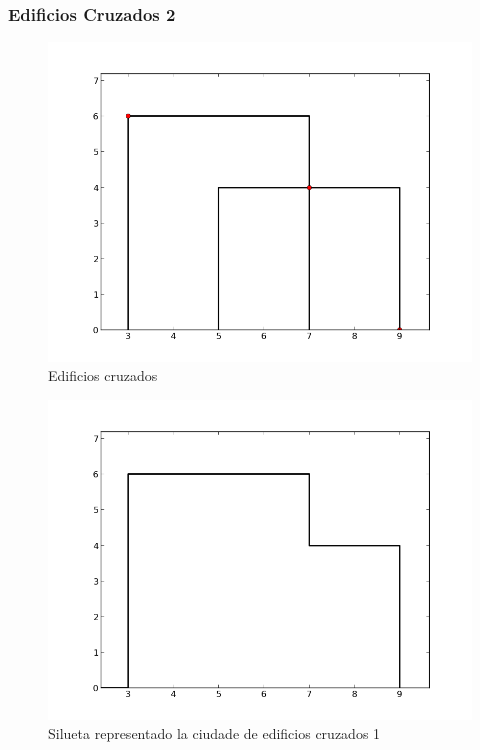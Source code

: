\subsubsection*{Edificios Cruzados 2}
\begin{figure}[H]
\begin{center}
\includegraphics[scale=0.5]{./imagenes/ej2_edificio3.png}
\caption{Edificios cruzados}
\end{center}
\end{figure}
\begin{figure}[H]
\begin{center}
\includegraphics[scale=0.5]{./imagenes/ej2_edificio3solucion.png}
\caption{Silueta representado la ciudade de edificios cruzados 1}
\end{center}
\end{figure}

